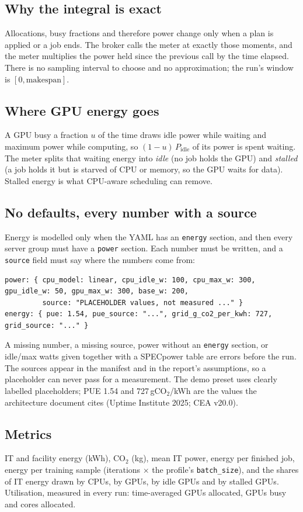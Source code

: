 \documentclass[11pt,a4paper]{article}
\newcommand{\code}[1]{\texttt{#1}}
\begin{document}
\subsection{Why the integral is exact}
Allocations, busy fractions and therefore power change only when a plan is applied or a job ends. The broker
calls the meter at exactly those moments, and the meter multiplies the power held since the previous call by
the time elapsed. There is no sampling interval to choose and no approximation; the run's window is
$[0, \text{makespan}]$.

\subsection{Where GPU energy goes}
A GPU busy a fraction $u$ of the time draws idle power while waiting and maximum power while computing, so
$(1-u)\,P_{\text{idle}}$ of its power is spent waiting. The meter splits that waiting energy into
\emph{idle} (no job holds the GPU) and \emph{stalled} (a job holds it but is starved of CPU or memory, so the GPU
waits for data). Stalled energy is what CPU-aware scheduling can remove.

\subsection{No defaults, every number with a source}
Energy is modelled only when the YAML has an \code{energy} section, and then every server group must have a
\code{power} section. Each number must be written, and a \code{source} field must say where the numbers come from:
\begin{lstlisting}
power: { cpu_model: linear, cpu_idle_w: 100, cpu_max_w: 300, gpu_idle_w: 50, gpu_max_w: 300, base_w: 200,
         source: "PLACEHOLDER values, not measured ..." }
energy: { pue: 1.54, pue_source: "...", grid_g_co2_per_kwh: 727, grid_source: "..." }
\end{lstlisting}
A missing number, a missing source, power without an \code{energy} section, or idle/max watts given together with
a SPECpower table are errors before the run. The sources appear in the manifest and in the report's assumptions,
so a placeholder can never pass for a measurement. The demo preset uses clearly labelled placeholders; PUE 1.54
and 727\,gCO$_2$/kWh are the values the architecture document cites (Uptime Institute 2025; CEA v20.0).

\subsection{Metrics}
IT and facility energy (kWh), CO$_2$ (kg), mean IT power, energy per finished job, energy per training sample
(iterations $\times$ the profile's \code{batch\_size}), and the shares of IT energy drawn by CPUs, by GPUs, by idle
GPUs and by stalled GPUs. Utilisation, measured in every run: time-averaged GPUs allocated, GPUs busy and cores
allocated.
\end{document}

